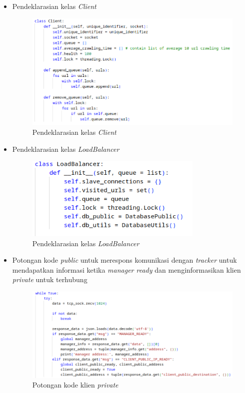 \begin{itemize}
	\item{Pendeklarasian kelas \emph{Client}}
	\begin{figure}[H]
		\centering{}
		\includegraphics[width=1\textwidth]{gambar/kode/potongan_client_02}
		\caption{Pendeklarasian kelas \emph{Client}}
	\end{figure}

	\item{Pendeklarasian kelas \emph{LoadBalancer}}
	\begin{figure}[H]
		\centering{}
		\includegraphics[width=0.8\textwidth]{gambar/kode/potongan_client_03}
		\caption{Pendeklarasian kelas \emph{LoadBalancer}}
	\end{figure}

	\clearpage
	\item{Potongan kode \emph{public} untuk merespons komunikasi dengan \emph{tracker} untuk mendapatkan informasi ketika \emph{manager ready} dan menginformasikan klien \emph{private} untuk terhubung}
	\begin{figure}[H]
		\centering{}
		\includegraphics[width=1\textwidth]{gambar/kode/potongan_client_09}
		\caption{Potongan kode klien \emph{private}}
	\end{figure}


\end{itemize}
